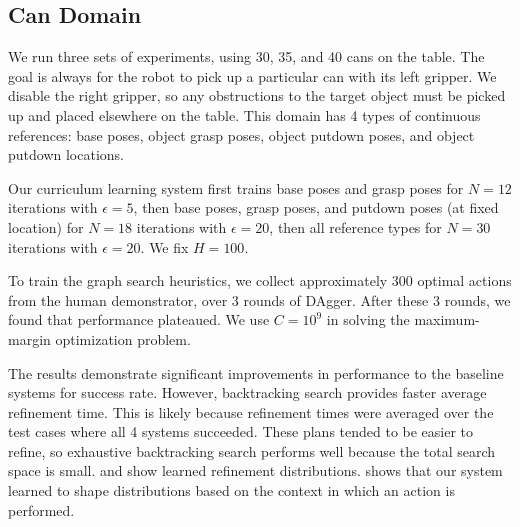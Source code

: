 \subsection{Can Domain}
We run three sets of experiments, using 30, 35, and 40 cans on the table.
The goal is always for the robot to pick up a particular can with its
left gripper. We disable the right gripper, so any obstructions to the target object must be picked up and
placed elsewhere on the table. This domain has 4 types of continuous references: base poses, object grasp
poses, object putdown poses, and object putdown locations.

Our curriculum learning system first trains base poses and grasp poses for $N = 12$ iterations with $\epsilon = 5$,
then base poses, grasp poses, and putdown poses (at fixed location) for $N = 18$ iterations with $\epsilon = 20$,
then all reference types for $N = 30$ iterations with $\epsilon = 20$. We fix $H = 100$.

To train the graph search heuristics,
we collect approximately 300 optimal actions from the human demonstrator, over 3 rounds of {\sc DAgger}. After these 3 rounds,
we found that performance plateaued. We use $C = 10^{9}$ in solving the maximum-margin optimization problem.

The results demonstrate significant improvements in performance to the baseline systems for success rate.
However, backtracking search provides faster average refinement time. This is likely because
refinement times were averaged over the test cases where all 4 systems succeeded. These plans tended
to be easier to refine, so exhaustive backtracking search performs well because the total search space is small.
 and  show learned refinement distributions.  shows
that our system learned to shape distributions based on the context in which an action is performed.

